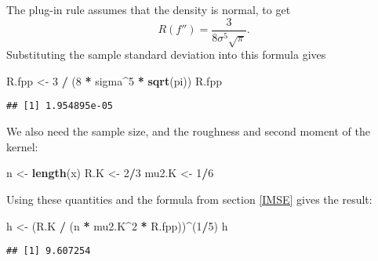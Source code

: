 \documentclass[
  a4paper,
]{article}
\newenvironment{Shaded}{\begin{snugshade}}{\end{snugshade}}
\newcommand{\DecValTok}[1]{\textcolor[rgb]{0.00,0.00,0.81}{#1}}
\newcommand{\FunctionTok}[1]{\textcolor[rgb]{0.13,0.29,0.53}{\textbf{#1}}}
\newcommand{\NormalTok}[1]{#1}
\newcommand{\OtherTok}[1]{\textcolor[rgb]{0.56,0.35,0.01}{#1}}
\newcommand{\SpecialCharTok}[1]{\textcolor[rgb]{0.81,0.36,0.00}{\textbf{#1}}}
\theoremstyle{definition}
\theoremstyle{definition}
\theoremstyle{definition}
\theoremstyle{definition}
\theoremstyle{remark}
\begin{document}
\begin{myanswers}

The plug-in rule assumes that the density is normal, to get
\begin{equation*}
  R(f'')
  = \frac{3}{8\sigma^5\sqrt{\pi}}.
\end{equation*}
Substituting the sample standard deviation into this formula gives

\begin{Shaded}
\begin{Highlighting}[]
\NormalTok{R.fpp }\OtherTok{\textless{}{-}} \DecValTok{3} \SpecialCharTok{/}\NormalTok{ (}\DecValTok{8} \SpecialCharTok{*}\NormalTok{ sigma}\SpecialCharTok{\^{}}\DecValTok{5} \SpecialCharTok{*} \FunctionTok{sqrt}\NormalTok{(pi))}
\NormalTok{R.fpp}
\end{Highlighting}
\end{Shaded}

\begin{verbatim}
## [1] 1.954895e-05
\end{verbatim}

We also need the sample size, and the roughness and second moment of the kernel:

\begin{Shaded}
\begin{Highlighting}[]
\NormalTok{n }\OtherTok{\textless{}{-}} \FunctionTok{length}\NormalTok{(x)}
\NormalTok{R.K }\OtherTok{\textless{}{-}} \DecValTok{2}\SpecialCharTok{/}\DecValTok{3}
\NormalTok{mu2.K }\OtherTok{\textless{}{-}} \DecValTok{1}\SpecialCharTok{/}\DecValTok{6}
\end{Highlighting}
\end{Shaded}

Using these quantities and the formula from section \ref{IMSE} gives
the result:

\begin{Shaded}
\begin{Highlighting}[]
\NormalTok{h }\OtherTok{\textless{}{-}}\NormalTok{ (R.K }\SpecialCharTok{/}\NormalTok{ (n }\SpecialCharTok{*}\NormalTok{ mu2.K}\SpecialCharTok{\^{}}\DecValTok{2} \SpecialCharTok{*}\NormalTok{ R.fpp))}\SpecialCharTok{\^{}}\NormalTok{(}\DecValTok{1}\SpecialCharTok{/}\DecValTok{5}\NormalTok{)}
\NormalTok{h}
\end{Highlighting}
\end{Shaded}

\begin{verbatim}
## [1] 9.607254
\end{verbatim}

\end{myanswers}
\end{document}

